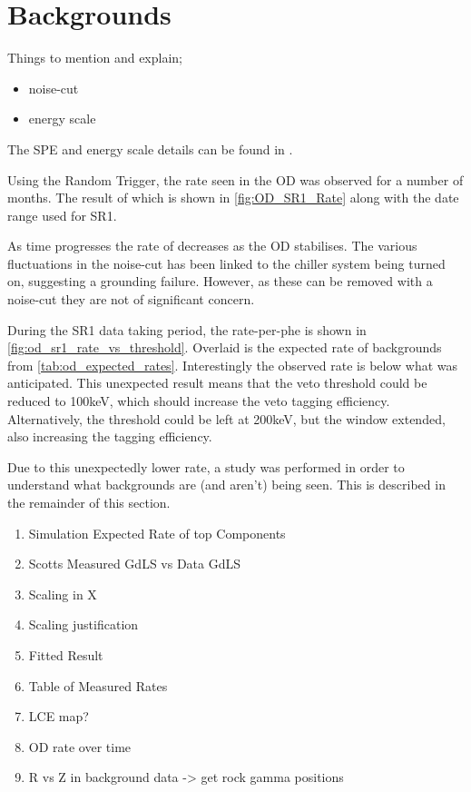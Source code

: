 \section{Backgrounds}
Things to mention and explain;
\begin{itemize}
    \item noise-cut
    \item energy scale
\end{itemize}

The SPE and energy scale details can be found in \cite{ewanfraser_thesis_ref}.





\par
Using the Random Trigger, the rate seen in the OD was observed for a number of months.
The result of which is shown in \autoref{fig:OD_SR1_Rate} along with the date range used for SR1.

\par
As time progresses the rate of decreases as the OD stabilises.
The various fluctuations in the noise-cut has been linked to the chiller system being turned on, suggesting a grounding failure.
However, as these can be removed with a noise-cut they are not of significant concern.


\par
During the SR1 data taking period, the rate-per-phe is shown in \autoref{fig:od_sr1_rate_vs_threshold}.
Overlaid is the expected rate of backgrounds from \autoref{tab:od_expected_rates}.
Interestingly the observed rate is below what was anticipated.
This unexpected result means that the veto threshold could be reduced to 100keV, which should increase the veto tagging efficiency.
Alternatively, the threshold could be left at 200keV, but the window extended, also increasing the tagging efficiency.



\par
Due to this unexpectedly lower rate, a study was performed in order to understand what backgrounds are (and aren't) being seen.
This is described in the remainder of this section.


\begin{tcolorbox}[colback=red!5!white, colframe=red!50!black, title=Key Plots]
\begin{enumerate}
    \item Simulation Expected Rate of top Components
    \item Scotts Measured GdLS vs Data GdLS
    \item Scaling in X
    \item Scaling justification
    \item Fitted Result
    \item Table of Measured Rates
    \item LCE map?
    \item OD rate over time
    \item R vs Z in background data -> get rock gamma positions    
\end{enumerate}
\end{tcolorbox}


